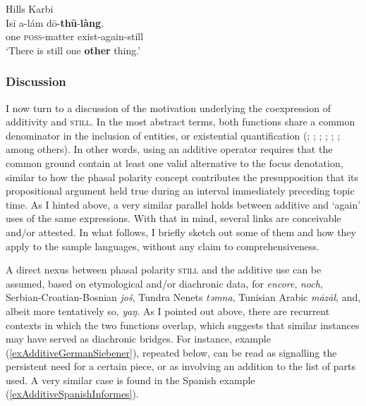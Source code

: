 \begin{exe}
	\ex Hills Karbi\label{exAdditiveKarbi}\\
	\gll Isī a-lám dō-\textbf{thū}-\textbf{làng}.\\
	one \textsc{poss}-matter exist-again-still\\
	\glt \lq There is still one \textbf{other} thing.' \parencite[336]{Konnerth2014}
\end{exe}

\subsubsection{Discussion}
I now turn to a discussion of the motivation underlying the coexpression of additivity and \textsc{still}. In the most abstract terms, both functions share a common denominator in the inclusion of entities, or existential quantification (\cite{vanderAuwera1993}; \cite{Doherty1973}; \cite{Liu2000}; \cite{Koenig1977}; \cite[531]{Maslova2003}; \cite[141]{Noelke1983}; among others). In other words, using an additive operator requires that the common ground contain at least one valid alternative to the focus denotation, similar to how the phasal polarity concept contributes the presupposition that its propositional argument held true during an interval immediately preceding topic time. As I hinted above, a very similar parallel holds between additive and  \lq again\rq{ }uses of the same expressions. With that in mind, several links are conceivable and/or attested. In what follows, I briefly sketch out some of them and how they apply to the sample languages, without any claim to comprehensiveness.

A direct nexus between phasal polarity \textsc{still} and the additive use can be assumed, based on etymological and/or diachronic data, for  \textit{encore},  \textit{noch}, Serbian-Croatian-Bosnian \textit{još}, Tundra Nenets \textit{təmna}, Tunisian Arabic \textit{māzāl}, and, albeit more tentatively so,  \textit{yaŋ}. As I pointed out above, there are recurrent contexts in which the two functions overlap, which suggests that similar instances may have served as diachronic bridges. For instance, example (\ref{exAdditiveGermanSiebener}), repeated below, can be read as signalling the persistent need for a certain piece, or as involving an addition to the list of parts used. A very similar case is found in the Spanish example (\ref{exAdditiveSpanishInformes}).


